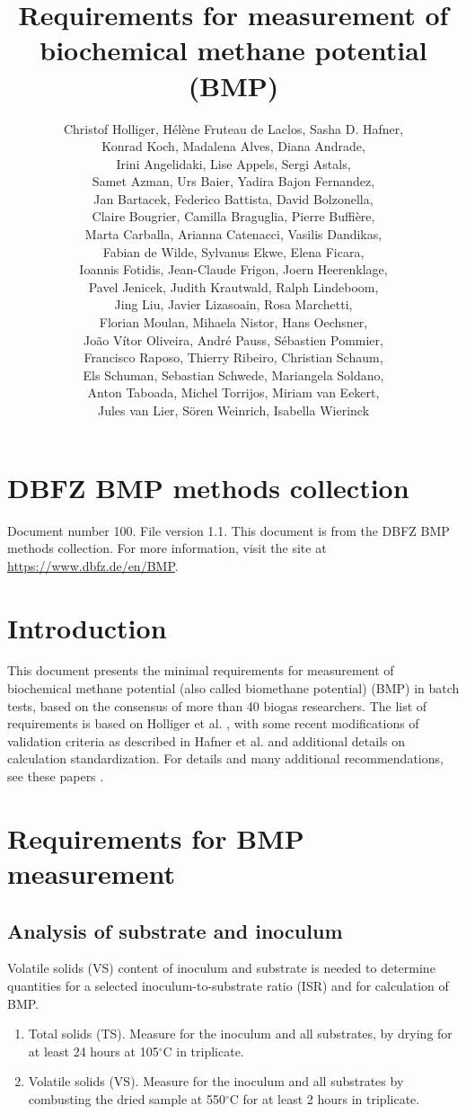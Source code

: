 \documentclass[]{article}
\title {Requirements for measurement of biochemical methane potential (BMP)}
\author{
Christof Holliger, 
H{\'e}l{\`e}ne Fruteau de Laclos,
Sasha D. Hafner,\\
Konrad Koch,
Madalena Alves, 
Diana Andrade,\\
Irini Angelidaki,
Lise Appels,
Sergi Astals, \\
Samet Azman,
Urs Baier,
Yadira Bajon Fernandez,\\
Jan Bartacek,
Federico Battista,
David Bolzonella,\\
Claire Bougrier,
Camilla Braguglia,
Pierre Buffi{\`e}re,\\
Marta Carballa,
Arianna Catenacci,
Vasilis Dandikas,\\
Fabian de Wilde,
Sylvanus Ekwe,
Elena Ficara,\\
Ioannis Fotidis,
Jean-Claude Frigon, 
Joern Heerenklage,\\
Pavel Jenicek,
Judith Krautwald,
Ralph Lindeboom,\\
Jing Liu,
Javier Lizasoain,
Rosa Marchetti,\\
Florian Moulan,
Mihaela Nistor,
Hans Oechsner,\\
Jo{\~a}o V{\'i}tor Oliveira,
Andr{\'e} Pauss,
S{\'e}bastien Pommier,\\
Francisco Raposo,
Thierry Ribeiro,
Christian Schaum,\\
Els Schuman,
Sebastian Schwede,
Mariangela Soldano,\\
Anton Taboada,
Michel Torrijos, 
Miriam van Eekert,\\
Jules van Lier,
S{\"o}ren Weinrich, 
Isabella Wierinck
}
\begin{document}
\maketitle

\section{DBFZ BMP methods collection}
Document number 100.
File version 1.1. 
This document is from the DBFZ BMP methods collection.
For more information, visit the site at \url{https://www.dbfz.de/en/BMP}.

\section{Introduction}
This document presents the minimal requirements for measurement of biochemical methane potential (also called biomethane potential) (BMP) in batch tests, based on the consensus of more than 40 biogas researchers.
The list of requirements is based on Holliger et al. \cite{iis2016}, with some recent modifications of validation criteria as described in Hafner et al. \cite{iis2020} and additional details on calculation standardization.
For details and many additional recommendations, see these papers \cite{iis2016,iis2020}.

\section{Requirements for BMP measurement}
\subsection{Analysis of substrate and inoculum}
\label{sec:analysis}
  Volatile solids (VS) content of inoculum and substrate is needed to determine quantities for a selected inoculum-to-substrate ratio (ISR) and for calculation of BMP.
  \begin{enumerate}
    \item Total solids (TS). Measure for the inoculum and all substrates, by drying for at least 24 hours at 105$^\circ$C in triplicate.
    \item Volatile solids (VS). Measure for the inoculum and all substrates by combusting the dried sample at 550$^\circ$C for at least 2 hours in triplicate.
  \end{enumerate}
\end{document}
